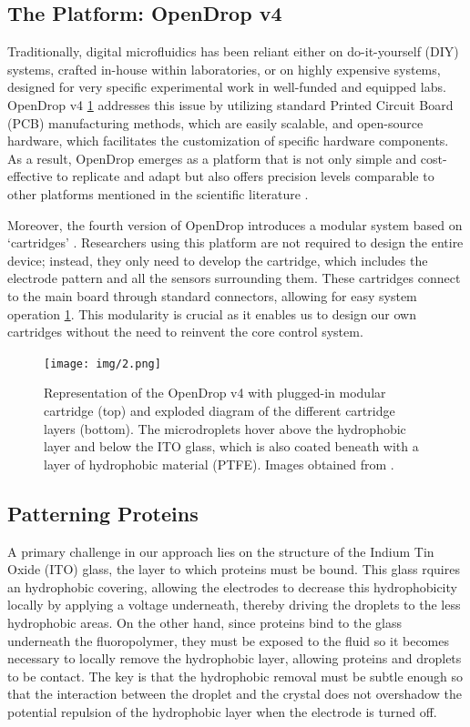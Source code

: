 \documentclass[8pt, twocolumn]{article}
\begin{document}
\newpage
\subsection*{The Platform: OpenDrop v4}

Traditionally, digital microfluidics has been reliant either on do-it-yourself (DIY) systems, crafted in-house within laboratories, or on highly expensive systems, designed for very specific experimental work in well-funded and equipped labs. OpenDrop v4 \ref{fig:cartridge} addresses this issue by utilizing standard Printed Circuit Board (PCB) manufacturing methods, which are easily scalable, and open-source hardware, which facilitates the customization of specific hardware components. As a result, OpenDrop emerges as a platform that is not only simple and cost-effective to replicate and adapt but also offers precision levels comparable to other platforms mentioned in the scientific literature \cite{alistarOpenDropIntegratedDoItYourself2017}.

Moreover, the fourth version of OpenDrop introduces a modular system based on `cartridges' \cite{OpenDropV4OpenDrop2020}. Researchers using this platform are not required to design the entire device; instead, they only need to develop the cartridge, which includes the electrode pattern and all the sensors surrounding them. These cartridges connect to the main board through standard connectors, allowing for easy system operation \ref{fig:cartridge}. This modularity is crucial as it enables us to design our own cartridges without the need to reinvent the core control system.

\begin{figure}[h]
  \centering
  \texttt{[image: img/2.png]}
  \caption{Representation of the OpenDrop v4 with plugged-in modular cartridge (top) and exploded diagram of the different cartridge layers (bottom). The microdroplets hover above the hydrophobic layer and below the ITO glass, which is also coated beneath with a layer of hydrophobic material (PTFE). Images obtained from \cite{OpenDropV4OpenDrop2020}.}
  \label{fig:cartridge}
\end{figure}

\subsection*{Patterning Proteins}

A primary challenge in our approach lies on the structure of the Indium Tin Oxide (ITO) glass, the layer to which proteins must be bound. This glass rquires an hydrophobic covering, allowing the electrodes to decrease this hydrophobicity locally by applying a voltage underneath, thereby driving the droplets to the less hydrophobic areas. On the other hand, since proteins bind to the glass underneath the fluoropolymer, they must be exposed to the fluid so it becomes necessary to locally remove the hydrophobic layer, allowing proteins and droplets to be contact. The key is that the hydrophobic removal must be subtle enough so that the interaction between the droplet and the crystal does not overshadow the potential repulsion of the hydrophobic layer when the electrode is turned off.
\end{document}
